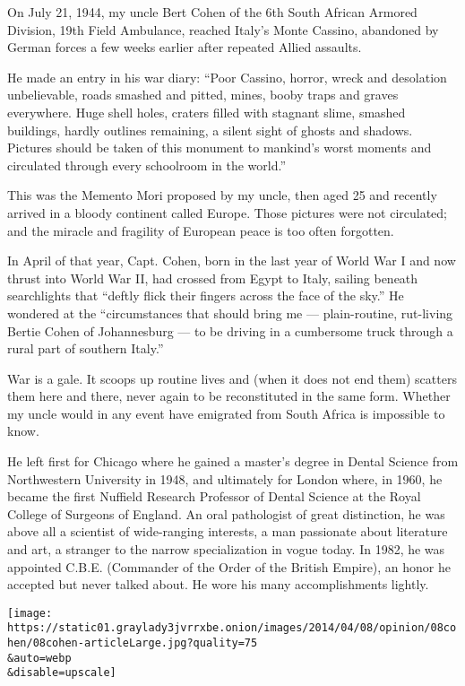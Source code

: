 On July 21, 1944, my uncle Bert Cohen of the 6th South African Armored
Division, 19th Field Ambulance, reached Italy's Monte Cassino, abandoned
by German forces a few weeks earlier after repeated Allied assaults.

He made an entry in his war diary: ``Poor Cassino, horror, wreck and
desolation unbelievable, roads smashed and pitted, mines, booby traps
and graves everywhere. Huge shell holes, craters filled with stagnant
slime, smashed buildings, hardly outlines remaining, a silent sight of
ghosts and shadows. Pictures should be taken of this monument to
mankind's worst moments and circulated through every schoolroom in the
world.''

This was the Memento Mori proposed by my uncle, then aged 25 and
recently arrived in a bloody continent called Europe. Those pictures
were not circulated; and the miracle and fragility of European peace is
too often forgotten.

In April of that year, Capt. Cohen, born in the last year of World War I
and now thrust into World War II, had crossed from Egypt to Italy,
sailing beneath searchlights that ``deftly flick their fingers across
the face of the sky.'' He wondered at the ``circumstances that should
bring me --- plain-routine, rut-living Bertie Cohen of Johannesburg ---
to be driving in a cumbersome truck through a rural part of southern
Italy.''

War is a gale. It scoops up routine lives and (when it does not end
them) scatters them here and there, never again to be reconstituted in
the same form. Whether my uncle would in any event have emigrated from
South Africa is impossible to know.

He left first for Chicago where he gained a master's degree in Dental
Science from Northwestern University in 1948, and ultimately for London
where, in 1960, he became the first Nuffield Research Professor of
Dental Science at the Royal College of Surgeons of England. An oral
pathologist of great distinction, he was above all a scientist of
wide-ranging interests, a man passionate about literature and art, a
stranger to the narrow specialization in vogue today. In 1982, he was
appointed C.B.E. (Commander of the Order of the British Empire), an
honor he accepted but never talked about. He wore his many
accomplishments lightly.

\texttt{[image: https://static01.graylady3jvrrxbe.onion/images/2014/04/08/opinion/08cohen/08cohen-articleLarge.jpg?quality=75\\\&auto=webp\\\&disable=upscale]}

